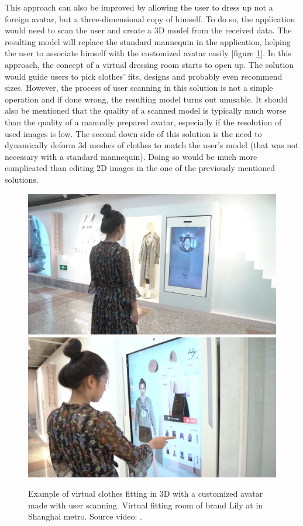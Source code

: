 \documentclass[a4paper]{report}
\begin{document}
\bigskip This approach can also be improved by allowing the user to dress up not a foreign avatar, but a three-dimensional copy of himself. To do so, the application would need to scan the user and create a 3D model from the received data. The resulting model will replace the standard mannequin in the application, helping the user to associate himself with the customized avatar easily [figure \ref{fig:example_3d_2}]. In this approach, the concept of a virtual dressing room starts to open up. The solution would guide users to pick clothes' fits, designs and probably even recommend sizes. However, the process of user scanning in this solution is not a simple operation and if done wrong, the resulting model turns out unusable. It should also be mentioned that the quality of a scanned model is typically much worse than the quality of a manually prepared avatar, especially if the resolution of used images is low. The second down side of this solution is the need to dynamically deform 3d meshes of clothes to match the user's model (that was not necessary with a standard mannequin). Doing so would be much more complicated than editing 2D images in the one of the previously mentioned solutions.



\begin{figure}[H]
  
  \includegraphics[width=\textwidth, keepaspectratio]{images/VFR/VFR_example_3D_2(1).png}
  \includegraphics[width=\textwidth, keepaspectratio]{images/VFR/VFR_example_3D_2(2).png}
  \caption{Example of virtual clothes fitting in 3D with a customized avatar made with user scanning. Virtual fitting room of brand Lily at in Shanghai metro. Source video: \cite{ARvirtualFittingYoutubeVideo}.}
  \label{fig:example_3d_2}
\end{figure}
\end{document}
